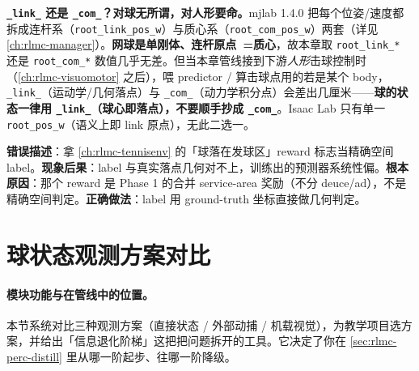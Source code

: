 \begin{finenote}
\textbf{\texttt{\_link\_} 还是 \texttt{\_com\_}？对球无所谓，对人形要命。}mjlab 1.4.0 把每个位姿/速度都拆成连杆系（\texttt{root\_link\_pos\_w}）与质心系（\texttt{root\_com\_pos\_w}）两套（详见 \cref{ch:rlmc-manager}）。\textbf{网球是单刚体、连杆原点~=质心}，故本章取 \texttt{root\_link\_*} 还是 \texttt{root\_com\_*} 数值几乎无差。但当本章管线接到下游\emph{人形}击球控制时（\cref{ch:rlmc-visuomotor} 之后），喂 predictor / 算击球点用的若是某个 body，\texttt{\_link\_}（运动学/几何落点）与 \texttt{\_com\_}（动力学积分点）会差出几厘米——\textbf{球的状态一律用 \texttt{\_link\_}（球心即落点），不要顺手抄成 \texttt{\_com\_}}。Isaac Lab 只有单一 \texttt{root\_pos\_w}（语义上即 link 原点），无此二选一。
\end{finenote}

\begin{pitfall}
\textbf{错误描述}：拿 \cref{ch:rlmc-tennisenv} 的「球落在发球区」reward 标志当精确空间 label。\textbf{现象后果}：label 与真实落点几何对不上，训练出的预测器系统性偏。\textbf{根本原因}：那个 reward 是 Phase 1 的合并 service-area 奖励（不分 deuce/ad），不是精确空间判定。\textbf{正确做法}：label 用 ground-truth 坐标直接做几何判定。
\end{pitfall}

\begin{practice}[本节动手任务]
\end{practice}

\section{球状态观测方案对比}
\label{sec:rlmc-perc-obs}

\paragraph{模块功能与在管线中的位置。}本节系统对比三种观测方案（直接状态 / 外部动捕 / 机载视觉），为教学项目选方案，并给出「信息退化阶梯」这把把问题拆开的工具。它决定了你在 \cref{sec:rlmc-perc-distill} 里从哪一阶起步、往哪一阶降级。

